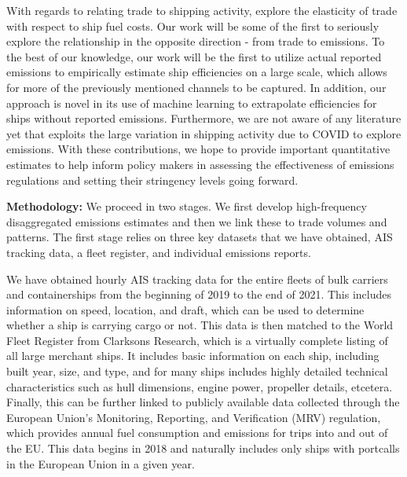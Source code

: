 \documentclass[hidelinks, 12pt,letterpaper]{article}
\begin{document}
With regards to relating trade to shipping activity, \citet{brancaccio2018impact} explore the elasticity of trade with respect to ship fuel costs. Our work will be some of the first to seriously explore the relationship in the opposite direction - from trade to emissions. To the best of our knowledge, our work will be the first to utilize actual reported emissions to empirically estimate ship efficiencies on a large scale, which allows for more of the previously mentioned channels to be captured. In addition, our approach is novel in its use of machine learning to extrapolate efficiencies for ships without reported emissions. Furthermore, we are not aware of any literature yet that exploits the large variation in shipping activity due to COVID to explore emissions. With these contributions, we hope to provide important quantitative estimates to help inform policy makers in assessing the effectiveness of emissions regulations and setting their stringency levels going forward.


\smallskip 

\noindent \textbf{Methodology:} We proceed in two stages. We first develop high-frequency disaggregated emissions estimates and then we link these to trade volumes and patterns. The first stage relies on three key datasets that we have obtained, AIS tracking data, a fleet register, and individual emissions reports.

We have obtained hourly AIS tracking data for the entire fleets of bulk carriers and containerships from the beginning of 2019 to the end of 2021. This includes information on speed, location, and draft, which can be used to determine whether a ship is carrying cargo or not. This data is then matched to the World Fleet Register from Clarksons Research, which is a virtually complete listing of all large merchant ships. It includes basic  information on each ship, including built year, size, and type, and for many ships includes highly detailed technical characteristics such as hull dimensions, engine power, propeller details, etcetera. Finally, this can be further linked to publicly available data collected through the European Union's Monitoring, Reporting, and Verification (MRV) regulation, which provides annual fuel consumption and emissions for trips into and out of the EU. This data begins in 2018 and naturally includes only ships with portcalls in the European Union in a given year.
\end{document}
